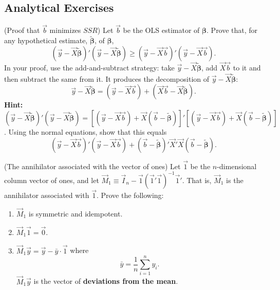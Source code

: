 
\begin{problemset}

\subsection*{Analytical Exercises}

\exercise[1] (Proof that $\vec{b}$ minimizes $SSR$)\quad
Let $\vec{b}$ be the OLS estimator of $\bm{\beta}$. Prove that, for
any hypothetical estimate, $\widetilde{\bm{\beta}}$, of $\bm{\beta}$,
%
\begin{equation}
(\vec{y} - \vec{X}\widetilde{\bm{\beta}})'(\vec{y} - \vec{X}\widetilde{\bm{\beta}})
\geq (\vec{y} - \vec{X}\vec{b})'(\vec{y} - \vec{X}\vec{b}).
\label{eq:ps1.1}
\end{equation}
%
In your proof, use the add-and-subtract strategy: take
$\vec{y} - \vec{X}\widetilde{\bm{\beta}}$, add $\vec{X}\vec{b}$ to it and
then subtract the same from it. It produces the decomposition of
$\vec{y} - \vec{X}\widetilde{\bm{\beta}}$:
%
\[
\vec{y} - \vec{X}\widetilde{\bm{\beta}}
= (\vec{y} - \vec{X}\vec{b}) + (\vec{X}\vec{b} - \vec{X}\widetilde{\bm{\beta}}).
\]
%
\textbf{Hint:}
$(\vec{y} - \vec{X}\widetilde{\bm{\beta}})'(\vec{y} - \vec{X}\widetilde{\bm{\beta}})
= [(\vec{y} - \vec{X}\vec{b}) + \vec{X}(\vec{b} - \widetilde{\bm{\beta}})]'
[(\vec{y} - \vec{X}\vec{b}) + \vec{X}(\vec{b} - \widetilde{\bm{\beta}})]$.
Using the normal equations, show that this equals
%
\[
(\vec{y} - \vec{X}\vec{b})'(\vec{y} - \vec{X}\vec{b})
+ (\vec{b} - \widetilde{\bm{\beta}})'\vec{X}'\vec{X}(\vec{b} - \widetilde{\bm{\beta}}).
\]

\exercise[2] (The annihilator associated with the vector of ones)\quad
Let $\vec{1}$ be the $n$-dimensional column vector of ones, and let
$\vec{M}_1 \equiv \vec{I}_n - \vec{1}(\vec{1}'\vec{1})^{-1}\vec{1}'$.
That is, $\vec{M}_1$ is the annihilator associated with $\vec{1}$.
Prove the following:

\begin{enumerate}[label=(\alph*)]
\item $\vec{M}_1$ is symmetric and idempotent.

\item $\vec{M}_1 \vec{1} = \vec{0}$.

\item $\vec{M}_1 \vec{y} = \vec{y} - \bar{y} \cdot \vec{1}$ where
\[
\bar{y} = \frac{1}{n} \sum_{i=1}^{n} y_i.
\]
$\vec{M}_1 \vec{y}$ is the vector of \textbf{deviations from the mean}.


\end{enumerate}
\end{problemset}
